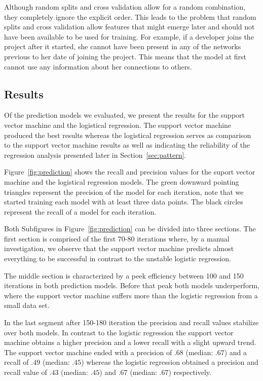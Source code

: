 \documentclass[12pt,oneside]{book}
\begin{document}
Although random splits and cross validation allow for a random combination, they completely ignore the explicit order.
This leads to the problem that random splits and cross validation allow features that might emerge later and should not have been available to be used for training.
For example, if a developer joins the project after it started, she cannot have been present in any of the networks previous to her date of joining the project.
This means that the model at first cannot use any information about her connections to others.




\subsection{Results}
Of the prediction models we evaluated, we present the results for the support
vector machine and the logistical regression. The support vector machine produced
the best results whereas the logistical regression serves as comparison to the
support vector machine results as well as indicating the reliability of
the regression analysis presented later in Section~\ref{sec:pattern}.

Figure~\ref{fig:prediction} shows the recall and precision values for the
suport vector machine and the logistical regression models. The green downward
pointing triangles represent the precision of the model for each iteration, note that we started training each model with at least three data points. The black circles represent the recall of a model for each
iteration.

Both Subfigures in Figure~\ref{fig:prediction} can be divided into three
sections. The first section is comprised of the first 70-80 iterations where,
by a manual investigation, we observe that the support vector machine predicts almost everything to be successful in contrast to the unstable logistic regression.

The middle section is characterized by a peek efficiency between 100 and 150
iterations in both prediction models. Before that peak both models underperform, where the support vector machine suffers more than the logistic regression from a small data set.

In the last segment after 150-180 iteration the precision and recall values
stabilize over both models. In contrast to the logistic regression the support vector machine obtains a higher precision and a lower recall with a slight upward trend.
The support vector machine ended with a precision of $.68$ (median: $.67$) and a recall of $.49$ (median: $.45$) whereas the logistic regression obtained a precision and recall value of $.43$ (median: $.45$) and $.67$ (median: $.67$) respectively.
\end{document}
